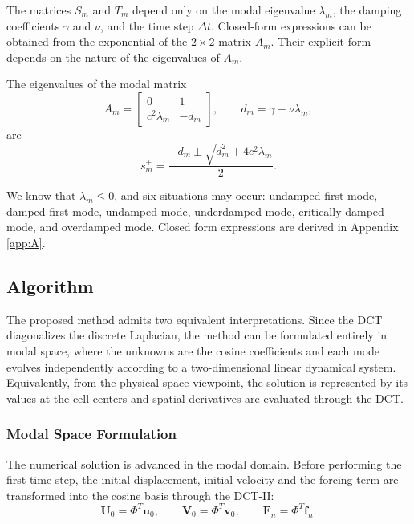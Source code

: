 \documentclass{Configuration_Files/PoliMi3i_thesis}
\begin{document}
The matrices $S_m$ and $T_m$ depend only on the modal eigenvalue $\lambda_m$, the damping coefficients $\gamma$ and $\nu$, and the time step $\Delta t$. Closed-form expressions can be obtained from the exponential of the $2\times2$ matrix $A_m$. Their explicit form depends on the nature of the eigenvalues of $A_m$.

The eigenvalues of the modal matrix
\begin{equation*}
A_m=
\begin{bmatrix}
0 & 1\\
c^2\lambda_m & -d_m
\end{bmatrix},
\qquad
d_m=\gamma-\nu\lambda_m,
\end{equation*}
are
\begin{equation*}
s_m^\pm
=
\frac{-d_m\pm\sqrt{d_m^2+4c^2\lambda_m}}{2}.
\end{equation*}

We know that $\lambda_m\le0$, and six situations may occur: undamped first mode, damped first mode, undamped mode, underdamped mode, critically damped mode, and overdamped mode. Closed form expressions are derived in Appendix \ref{app:A}.

\subsection{Algorithm}
The proposed method admits two equivalent interpretations. Since the DCT diagonalizes the discrete Laplacian, the method can be formulated entirely in modal space, where the unknowns are the cosine coefficients and each mode evolves independently according to a two-dimensional linear dynamical system. Equivalently, from the physical-space viewpoint, the solution is represented by its values at the cell centers and spatial derivatives are evaluated through the DCT.

\subsubsection{Modal Space Formulation}
The numerical solution is advanced in the modal domain. Before performing the first time step, the initial displacement, initial velocity and the forcing term are transformed into the cosine basis through the DCT-II:
\begin{equation*}
\mathbf U_0
=
\Phi^T\mathbf u_0,
\qquad
\mathbf V_0
=
\Phi^T\mathbf v_0,
\qquad
\mathbf F_n
=
\Phi^T\mathbf f_n.
\end{equation*}
\end{document}
